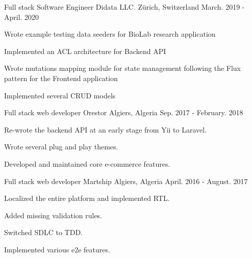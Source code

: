 \begin{cventries}
  \cventry
    {Full stack Software Engineer} %
    {Didata LLC.} %
    {Zürich, Switzerland} %
    {March. 2019 - April. 2020} %
    {
      \begin{cvitems} %
        \item {Wrote example testing data seeders for BioLab research application}
        \item {Implemented an ACL architecture for Backend API}
        \item {Wrote mutations mapping module for state management following the Flux pattern for the Frontend application}
        \item {Implemented several CRUD models}
      \end{cvitems}
    }

  \cventry
    {Full stack web developer} %
    {Orestor} %
    {Algiers, Algeria} %
    {Sep. 2017 - February. 2018} %
    {
      \begin{cvitems} %
        \item {Re-wrote the backend API at an early stage from Yii to Laravel.}
        \item {Wrote several plug and play themes.}
        \item {Developed and maintained core e-commerce features.}
      \end{cvitems}
    }

  \cventry
    {Full stack web developer} %
    {Martship} %
    {Algiers, Algeria} %
    {April. 2016 - August. 2017} %
    {
      \begin{cvitems} %
        \item {Localized the entire platform and implemented RTL.}
        \item {Added missing validation rules.}
        \item {Switched SDLC to TDD.}
        \item {Implemented various e2e features.}
      \end{cvitems}
    }

\end{cventries}

